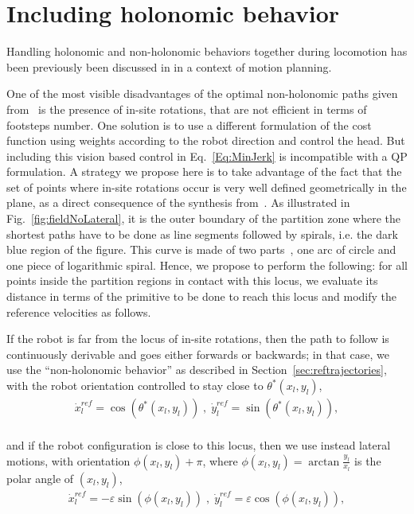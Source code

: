 
\section{Including holonomic behavior}
\label{sec:includingholonomic}

Handling holonomic and non-holonomic behaviors together during locomotion has been previously been discussed in \cite{MombaurHumanoids2008} in a context of motion planning.

One of the most visible disadvantages of the optimal non-holonomic paths given from~\cite{jib-IJHR2010} is the presence of in-site rotations, that are not efficient in terms of footsteps number.
One solution is to use a different formulation of the cost function using weights according to the robot direction and control the head.
But including this vision based control in Eq.~\ref{Eq:MinJerk} is incompatible with a QP formulation.
A strategy we propose here is to take advantage of the fact that the set of points where in-site rotations occur is very well defined geometrically in the plane, as a direct consequence of the synthesis from~\cite{Salaris:2010}. As illustrated in Fig.~\ref{fig:fieldNoLateral}, it is the outer boundary of the partition zone where the shortest paths have to be done as line segments followed by spirals, i.e. the dark blue region of the figure. This curve is made of two parts~\cite{Salaris:2010}, one arc of circle and one piece of logarithmic spiral. Hence, we propose to perform the following: for all points inside the partition regions in contact with this locus, we evaluate its distance in terms of the primitive to be done to reach this locus and modify the reference velocities as follows. 

If the robot is far from the locus of in-site rotations, then the path to follow is continuously derivable and goes either forwards or backwards; in that case, we use the ``non-holonomic behavior'' as described in Section~\ref{sec:reftrajectories}, with the robot orientation controlled to stay close to $\theta^*(x_l,y_l)$,
$$
\begin{array}{c}
\dot{x}^{ref}_l  =  \cos(\theta^*(x_l,y_l)) \;,\; \dot{y}^{ref}_l  =  \sin(\theta^*(x_l,y_l)), \\
\end{array}
$$

and if the robot configuration is close to this locus, then we use instead lateral motions, with orientation $\phi(x_l,y_l)+\pi$, where $\phi(x_l,y_l)=\arctan\frac{y_l}{x_l}$ is the polar angle of $(x_l,y_l)$,
$$
\begin{array}{c}
\dot{x}^{ref}_l  =  -\varepsilon\sin(\phi(x_l,y_l)) \;,\; \dot{y}^{ref}_l  =  \varepsilon\cos(\phi(x_l,y_l)),  \\
\end{array}
$$

